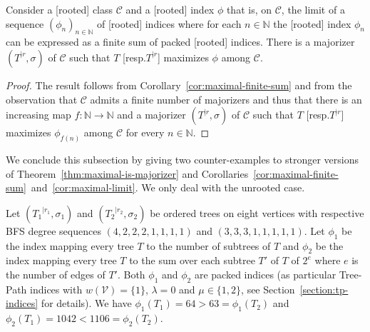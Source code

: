 \documentclass[11 pt]{modarticle}
\newcommand{\cN}{\mathbb{N}}
\newcommand{\vset}{\mathcal{V}}
\newcommand{\wmap}{w}
\newcommand{\rtree}[2]{{#1}^{\lvert #2}}
\newcommand{\ortree}[3]{(\rtree{#1}{#2},{#3})}
\newcommand{\tclass}{\mathcal{C}}
\begin{document}
\begin{cor}\label{cor:maximal-limit}
Consider a [rooted] class $\tclass$ and a [rooted] index $\phi$ that is, on $\tclass$, the limit of a sequence $(\phi_n)_{n \in \cN}$ of [rooted] indices where for each $n \in \cN$ the [rooted] index $\phi_n$ can be expressed as a finite sum of packed [rooted] indices. There is a majorizer $\ortree{T}{r}{\sigma}$ of $\tclass$ such that $T$ [resp.\@ $\rtree{T}{r}$] maximizes $\phi$ among $\tclass$.
\end{cor}

\begin{proof}
The result follows from Corollary~\ref{cor:maximal-finite-sum} and from the observation that $\tclass$ admits a finite number of majorizers and thus that there is an increasing map $f : \cN \to \cN$ and a majorizer $\ortree{T}{r}{\sigma}$ of $\tclass$ such that $T$ [resp.\@ $\rtree{T}{r}$] maximizes $\phi_{f(n)}$ among $\tclass$ for every $n \in \cN$.
\end{proof}

We conclude this subsection by giving two counter-examples to stronger versions of Theorem~\ref{thm:maximal-is-majorizer} and Corollaries~\ref{cor:maximal-finite-sum}~and~\ref{cor:maximal-limit}. We only deal with the unrooted case.

Let $\ortree{T_1}{r_1}{\sigma_1}$ and $\ortree{T_2}{r_2}{\sigma_2}$ be ordered trees on eight vertices with respective BFS degree sequences $(4, 2, 2, 2, 1, 1, 1, 1)$ and $(3, 3, 3, 1, 1, 1, 1, 1)$. Let $\phi_1$ be the index mapping every tree $T$ to the number of subtrees of $T$ and $\phi_2$ be the index mapping every tree $T$ to the sum over each subtree $T'$ of $T$ of $2^e$ where $e$ is the number of edges of $T'$. Both $\phi_1$ and $\phi_2$ are packed indices (as particular Tree-Path indices with $\wmap(\vset) = \{1\}$, $\lambda = 0$ and $\mu \in \{1,2\}$, see Section~\ref{section:tp-indices} for details). We have $\phi_1(T_1) = 64 > 63 = \phi_1(T_2)$ and $\phi_2(T_1) = 1042 < 1106 = \phi_2(T_2)$.
\end{document}
